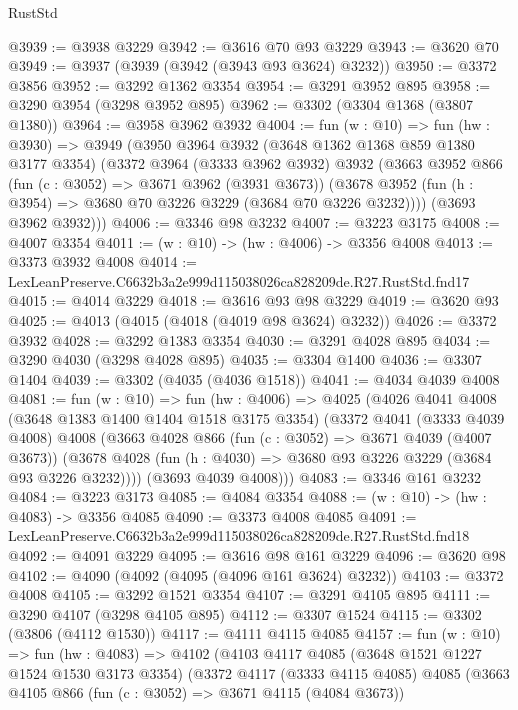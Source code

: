 \begin{lexlean}{RustStd}
\begin{coremodule}
@3939 := @3938 @3229
@3942 := @3616 @70 @93 @3229
@3943 := @3620 @70
@3949 := @3937 (@3939 (@3942 (@3943 @93 @3624) @3232))
@3950 := @3372 @3856
@3952 := @3292 @1362 @3354
@3954 := @3291 @3952 @895
@3958 := @3290 @3954 (@3298 @3952 @895)
@3962 := @3302 (@3304 @1368 (@3807 @1380))
@3964 := @3958 @3962 @3932
@4004 := fun (w : @10) =>
  fun (hw : @3930) =>
  @3949
    (@3950
      @3964
      @3932
      (@3648 @1362 @1368 @859 @1380 @3177 @3354)
      (@3372
        @3964
        (@3333 @3962 @3932)
        @3932
        (@3663
          @3952
          @866
          (fun (c : @3052) => @3671 @3962 (@3931 @3673))
          (@3678 @3952 (fun (h : @3954) => @3680 @70 @3226 @3229 (@3684 @70 @3226 @3232))))
        (@3693 @3962 @3932)))
@4006 := @3346 @98 @3232
@4007 := @3223 @3175
@4008 := @4007 @3354
@4011 := (w : @10) -> (hw : @4006) -> @3356 @4008
@4013 := @3373 @3932 @4008
@4014 := LexLeanPreserve.C6632b3a2e999d115038026ca828209de.R27.RustStd.fnd17
@4015 := @4014 @3229
@4018 := @3616 @93 @98 @3229
@4019 := @3620 @93
@4025 := @4013 (@4015 (@4018 (@4019 @98 @3624) @3232))
@4026 := @3372 @3932
@4028 := @3292 @1383 @3354
@4030 := @3291 @4028 @895
@4034 := @3290 @4030 (@3298 @4028 @895)
@4035 := @3304 @1400
@4036 := @3307 @1404
@4039 := @3302 (@4035 (@4036 @1518))
@4041 := @4034 @4039 @4008
@4081 := fun (w : @10) =>
  fun (hw : @4006) =>
  @4025
    (@4026
      @4041
      @4008
      (@3648 @1383 @1400 @1404 @1518 @3175 @3354)
      (@3372
        @4041
        (@3333 @4039 @4008)
        @4008
        (@3663
          @4028
          @866
          (fun (c : @3052) => @3671 @4039 (@4007 @3673))
          (@3678 @4028 (fun (h : @4030) => @3680 @93 @3226 @3229 (@3684 @93 @3226 @3232))))
        (@3693 @4039 @4008)))
@4083 := @3346 @161 @3232
@4084 := @3223 @3173
@4085 := @4084 @3354
@4088 := (w : @10) -> (hw : @4083) -> @3356 @4085
@4090 := @3373 @4008 @4085
@4091 := LexLeanPreserve.C6632b3a2e999d115038026ca828209de.R27.RustStd.fnd18
@4092 := @4091 @3229
@4095 := @3616 @98 @161 @3229
@4096 := @3620 @98
@4102 := @4090 (@4092 (@4095 (@4096 @161 @3624) @3232))
@4103 := @3372 @4008
@4105 := @3292 @1521 @3354
@4107 := @3291 @4105 @895
@4111 := @3290 @4107 (@3298 @4105 @895)
@4112 := @3307 @1524
@4115 := @3302 (@3806 (@4112 @1530))
@4117 := @4111 @4115 @4085
@4157 := fun (w : @10) =>
  fun (hw : @4083) =>
  @4102
    (@4103
      @4117
      @4085
      (@3648 @1521 @1227 @1524 @1530 @3173 @3354)
      (@3372
        @4117
        (@3333 @4115 @4085)
        @4085
        (@3663
          @4105
          @866
          (fun (c : @3052) => @3671 @4115 (@4084 @3673))

\end{coremodule}
\end{lexlean}
